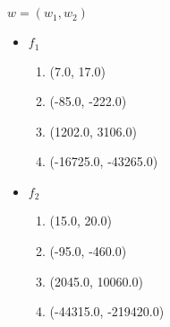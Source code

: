 \documentclass[12pt]{article}
\begin{document}
\section{}
$ w = (w_1, w_2) $
\begin{itemize}
	\item $ f_1 $
	\begin{enumerate}
		\item (7.0, 17.0)
		\item (-85.0, -222.0)
		\item (1202.0, 3106.0)
		\item (-16725.0, -43265.0)
	\end{enumerate}

	\item $ f_2 $
	\begin{enumerate}
		\item (15.0, 20.0)
		\item (-95.0, -460.0)
		\item (2045.0, 10060.0)
		\item (-44315.0, -219420.0)
	\end{enumerate} 
\end{itemize}
\end{document}

